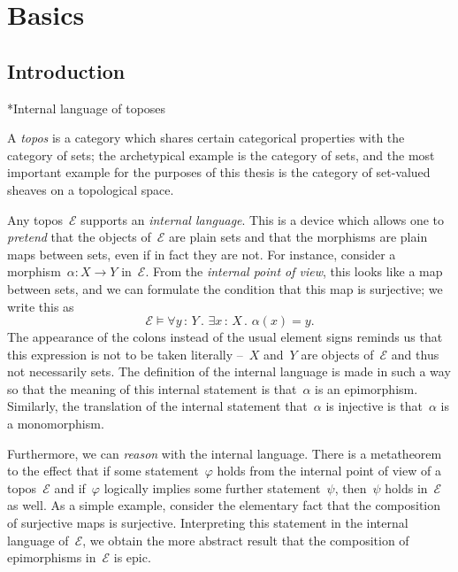 \documentclass[10pt,reqno,a4paper]{amsbook}
\makeatletter
\theoremstyle{definition}
\theoremstyle{plain}
\theoremstyle{remark}
\newcommand{\E}{\mathcal{E}}
\newcommand{\?}{\,{:}\,}
\renewcommand{\_}{\mathpunct{.}\,}
\newcommand{\nocontentsline}[3]{}
\newcommand{\tocless}[1]{\let\addcontentsline=\nocontentsline}
\def\subsection{\@startsection{subsection}{2}%
  {0pt}{.5\linespacing\@plus.7\linespacing}{-.5em}%
  {\normalfont\bfseries}}
\makeatother
\begin{document}

\setcounter{tocdepth}{2}
\tableofcontents


\chapter{Basics}

\section{Introduction}

{\tocless

\subsection*{Internal language of toposes}

A \emph{topos} is a category which shares certain categorical properties with
the category of sets; the archetypical example is the category of sets, and
the most important example for the purposes of this thesis is the category of
set-valued sheaves on a topological space.

Any topos~$\E$ supports an \emph{internal language}. This is a device which
allows one to \emph{pretend} that the objects of~$\E$ are plain sets and that
the morphisms are plain maps between sets, even if in fact they are not. For
instance, consider a morphism~$\alpha : X \to Y$ in~$\E$. From the \emph{internal
point of view}, this looks like a map between sets, and we can formulate the
condition that this map is surjective; we write this as
\[ \E \models \forall y\?Y\_ \exists x\?X\_ \alpha(x) = y. \]
The appearance of the colons instead of the usual element signs reminds us that
this expression is not to be taken literally --~$X$ and~$Y$ are objects of~$\E$
and thus not necessarily sets. The definition of the internal language is made
in such a way so that the meaning of this internal statement is that~$\alpha$
is an epimorphism. Similarly, the translation of the internal statement
that~$\alpha$ is injective is that~$\alpha$ is a monomorphism.

Furthermore, we can \emph{reason} with the internal language. There is a
metatheorem to the effect that if some statement~$\varphi$ holds from the
internal point of view of a topos~$\E$ and if~$\varphi$ logically implies some
further statement~$\psi$, then~$\psi$ holds in~$\E$ as well. As a simple
example, consider the elementary fact that the composition of surjective maps
is surjective. Interpreting this statement in the internal language of~$\E$, we
obtain the more abstract result that the composition of epimorphisms in~$\E$ is
epic.

}
\end{document}
